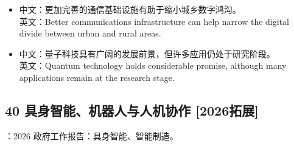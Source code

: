 \documentclass[a4paper,11pt,UTF8,fontset=none]{ctexart}
\begin{document}
\par

\begin{itemize}[leftmargin=1.7em,itemsep=1pt,parsep=0pt,topsep=2pt]
\item \noindent 中文：更加完善的通信基础设施有助于缩小城乡数字鸿沟。\\ 英文：Better communications infrastructure can help narrow the digital divide between urban and rural areas.\par


\item \noindent 中文：量子科技具有广阔的发展前景，但许多应用仍处于研究阶段。\\ 英文：Quantum technology holds considerable promise, although many applications remain at the research stage.\par


\end{itemize}

\subsection{40 具身智能、机器人与人机协作 {\color{AccentBlue} [2026拓展]}}

\begin{tcolorbox}[enhanced,breakable,boxrule=0.35pt,colback=VeryPaleBlue,colframe=AccentBlue!40,left=7pt,right=7pt,top=4pt,bottom=4pt,borderline west={2pt}{0pt}{AccentBlue},before skip=4pt,after skip=6pt]
：2026 政府工作报告：具身智能、智能制造。\par


\end{tcolorbox}
\end{document}
